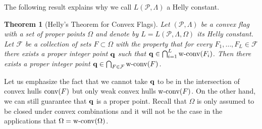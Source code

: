 \documentclass{daj}
\renewcommand{\P}{\mathcal P}
\newcommand{\wc}{\mbox{\rm w-conv}}
\renewcommand{\c}{\mbox{\rm conv}}
\newtheorem{theorem}{Theorem}[section]
\theoremstyle{definition}
\theoremstyle{remark}
\theoremstyle{definition}
\theoremstyle{definition}
\begin{document}
The following result explains why we call $L(\P, \Lambda)$ a Helly constant.

\begin{theorem}[Helly's Theorem for Convex Flags]\label{Helly}
Let $(\P, \Lambda)$ be a convex flag with a set of proper points $\Omega$ and denote by $L = L(\P, \Lambda, \Omega)$ its Helly constant.
Let $\mathcal F$ be a collection of sets $F \subset \Omega$ with the property that for every $F_1, \ldots, F_L \in \mathcal F$ there exists a proper integer point ${\bf q}$ such that ${\bf q} \in \bigcap_{i=1}^L \wc(F_i)$. Then there exists a proper integer point ${\bf q} \in \bigcap_{F \in \mathcal F} \wc(F)$.
\end{theorem}

Let us emphasize the fact that we cannot take ${\bf q}$ to be in the intersection of convex hulls $\c(F)$ but only weak convex hulls $\wc(F)$. On the other hand, we can still guarantee that ${\bf q}$ is a proper point. Recall that $\Omega$ is only assumed to be closed under convex combinations and it will not be the case in the applications that $\Omega = \wc(\Omega)$. 
\end{document}
